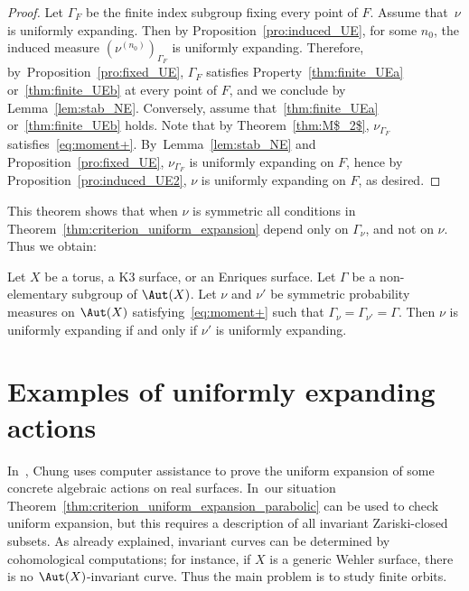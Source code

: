 \begin{proof}
Let $\Gamma_F$ be the finite index subgroup fixing every point of $F$.
Assume that~$\nu$ is uniformly expanding. Then by Proposition~\ref{pro:induced_UE}, for some
$n_0$, the induced measure $(\nu^{(n_0)})_{\Gamma_F}$ is uniformly expanding. Therefore, by~Proposition~\ref{pro:fixed_UE}, $\Gamma_F$ satisfies Property~\eqref{thm:finite_UEa} or~\eqref{thm:finite_UEb} at every point of $F$, and
we conclude by Lemma~\ref{lem:stab_NE}.
Conversely, assume that~\eqref{thm:finite_UEa} or~\eqref{thm:finite_UEb} holds. Note that by Theorem~\ref{thm:M$_2$},
$\nu_{\Gamma_F}$ satisfies~\eqref{eq:moment+}. By~Lemma~\ref{lem:stab_NE} and Proposition~\ref{pro:fixed_UE},
$\nu_{\Gamma_F}$ is uniformly expanding on $F$,
hence by Proposition~\ref{pro:induced_UE2}, $\nu$ is uniformly expanding on $F$, as desired.
\end{proof}

This theorem shows that when $\nu$ is symmetric
all conditions in Theorem~\ref{thm:criterion_uniform_expansion} depend only on
$\Gamma_\nu$, and not on $\nu$. Thus we obtain:

\begin{cor}\label{cor:independence_nu}
Let $X$ be a torus, a K3 surface, or an Enriques surface. Let $\Gamma$ be a non-elementary subgroup of $\Aut(X)$. Let $\nu$ and $\nu'$ be symmetric probability measures
on $\Aut(X)$ satisfying~\eqref{eq:moment+} such that $\Gamma_\nu = \Gamma_{\nu'}=\Gamma$. Then $\nu$ is uniformly expanding if and only if $\nu'$ is
uniformly expanding.
\end{cor}

\section{Examples of uniformly expanding actions}

\label{subs:finitary}

In~\cite[\S\S 7-8]{chung}, Chung uses computer assistance to prove the uniform expansion of
some concrete algebraic actions on real surfaces. In~our situation
Theorem~\ref{thm:criterion_uniform_expansion_parabolic} can be used to
check uniform expansion, but this requires a description of all invariant Zariski-closed subsets.
As already explained, invariant curves can be determined by cohomological computations; for instance, if $X$ is a generic Wehler surface, there is no $\Aut(X)$-invariant curve. Thus the main problem is to study finite orbits.

